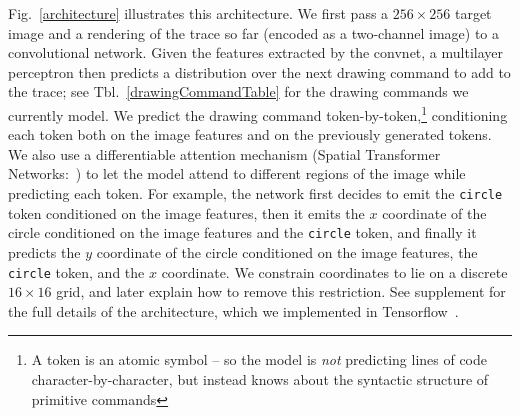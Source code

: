 \documentclass{article}
\newcommand{\remark}[1]{\textcolor{red}{[#1]}}
\begin{document}
Fig.~\ref{architecture} illustrates this architecture.  We first
pass a $256\times 256$ target image and a rendering of the trace so
far (encoded as a two-channel image) to a convolutional network. Given
the features extracted by the convnet, a multilayer perceptron then
predicts a distribution over the next drawing command to add to the
trace; see Tbl.~\ref{drawingCommandTable} for the drawing commands we currently model.  We predict the drawing
command token-by-token,\footnote{A token is an atomic symbol  -- so the model is \emph{not} predicting lines of code character-by-character, but instead knows about the syntactic structure of primitive commands} conditioning each token both on the image
features and on the previously generated tokens. We also use a
differentiable attention mechanism (Spatial Transformer
Networks:~\cite{jaderberg2015spatial}) to let the model attend to
different regions of the image while predicting each token. For
example, the network first decides to emit the \verb|circle| token
conditioned on the image features, then it emits the $x$ coordinate of
the circle conditioned on the image features and the \verb|circle|
token, and finally it predicts the $y$ coordinate of the circle
conditioned on the image features, the \verb|circle| token, and the
$x$ coordinate. We constrain
coordinates to lie on a discrete $16\times 16$ grid, and later explain
how to remove this restriction.  See supplement for the full details
of the architecture, which we implemented in
Tensorflow~\cite{tensorflow2015-whitepaper}.
\end{document}
